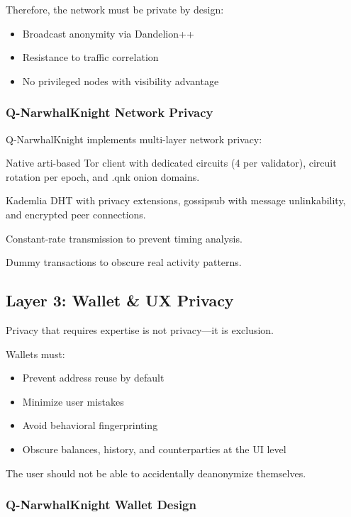 \documentclass[12pt,a4paper]{article}
\begin{document}
Therefore, the network must be private by design:
\begin{itemize}
    \item Broadcast anonymity via Dandelion++
    \item Resistance to traffic correlation
    \item No privileged nodes with visibility advantage
\end{itemize}

\subsubsection{Q-NarwhalKnight Network Privacy}

Q-NarwhalKnight implements multi-layer network privacy:

\begin{description}[leftmargin=1cm]
    \item[Tor Integration:] Native arti-based Tor client with dedicated circuits (4 per validator), circuit rotation per epoch, and .qnk onion domains.
    \item[libp2p Privacy:] Kademlia DHT with privacy extensions, gossipsub with message unlinkability, and encrypted peer connections.
    \item[Traffic Shaping:] Constant-rate transmission to prevent timing analysis.
    \item[Decoy Traffic:] Dummy transactions to obscure real activity patterns.
\end{description}

\subsection{Layer 3: Wallet \& UX Privacy}

Privacy that requires expertise is not privacy---it is exclusion.

Wallets must:
\begin{itemize}
    \item Prevent address reuse by default
    \item Minimize user mistakes
    \item Avoid behavioral fingerprinting
    \item Obscure balances, history, and counterparties at the UI level
\end{itemize}

The user should not be able to accidentally deanonymize themselves.

\subsubsection{Q-NarwhalKnight Wallet Design}
\end{document}
